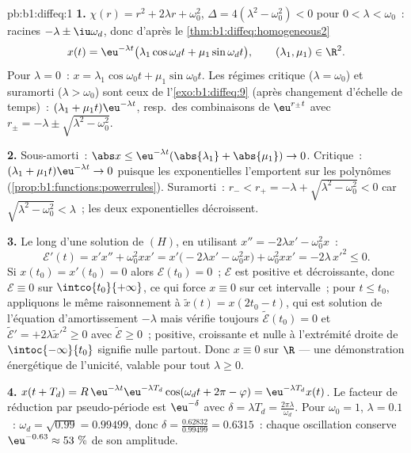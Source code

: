\begin{solution}{pb:b1:diffeq:1}
\textbf{1.} $\chi(r) = r^2 + 2\lambda r + \omega_0^2$, $\Delta =
4(\lambda^2 - \omega_0^2) < 0$ pour $0 < \lambda < \omega_0$~: racines
$-\lambda \pm \iu\omega_d$, donc d'après
le \cref{thm:b1:diffeq:homogeneous2}
\[
x(t) = \eu^{-\lambda t}\bigl(\lambda_1\cos\omega_d t +
\mu_1\sin\omega_d t\bigr), \qquad (\lambda_1, \mu_1) \in \R^2 .
\]
Pour $\lambda = 0$~: $x = \lambda_1\cos\omega_0 t +
\mu_1\sin\omega_0 t$. Les régimes critique ($\lambda = \omega_0$) et
suramorti ($\lambda > \omega_0$) sont ceux de
l'\cref{exo:b1:diffeq:9} (après changement d'échelle de temps)~:
$(\lambda_1 + \mu_1 t)\eu^{-\lambda t}$, resp.\ des combinaisons de
$\eu^{r_\pm t}$ avec $r_\pm = -\lambda \pm \sqrt{\lambda^2 -
\omega_0^2}$.

\textbf{2.} Sous-amorti~: $\abs x \leq \eu^{-\lambda
t}(\abs{\lambda_1} + \abs{\mu_1}) \to 0$. Critique~: $(\lambda_1 +
\mu_1 t)\eu^{-\lambda t} \to 0$ puisque les exponentielles l'emportent
sur les polynômes (\cref{prop:b1:functions:powerrules}). Suramorti~:
$r_- < r_+ = -\lambda + \sqrt{\lambda^2 - \omega_0^2} < 0$ car
$\sqrt{\lambda^2 - \omega_0^2} < \lambda$~; les deux exponentielles
décroissent.

\textbf{3.} Le long d'une solution de $(H)$, en utilisant $x'' =
-2\lambda x' - \omega_0^2 x$~:
\[
\mathcal E'(t) = x'x'' + \omega_0^2 x x'
= x'\bigl(-2\lambda x' - \omega_0^2 x\bigr) + \omega_0^2 xx'
= -2\lambda\,x'^2 \leq 0 .
\]
Si $x(t_0) = x'(t_0) = 0$ alors $\mathcal E(t_0) = 0$~; $\mathcal E$
est positive et décroissante, donc $\mathcal E \equiv 0$ sur
$\intco{t_0}{+\infty}$, ce qui force $x \equiv 0$ sur cet
intervalle~; pour $t \leq t_0$, appliquons le même raisonnement à
$\tilde x(t) = x(2t_0 - t)$, qui est solution de l'équation
d'amortissement $-\lambda$ mais vérifie toujours
$\tilde{\mathcal E}(t_0) = 0$ et $\tilde{\mathcal E}' =
+2\lambda\tilde x'^2 \geq 0$ avec $\tilde{\mathcal E} \geq 0$~;
positive, croissante et nulle à l'extrémité droite de
$\intoc{-\infty}{t_0}$ signifie nulle partout. Donc $x \equiv 0$ sur
$\R$ --- une démonstration énergétique de l'unicité, valable pour tout
$\lambda \geq 0$.

\textbf{4.} $x(t + T_d) = R\,\eu^{-\lambda t}\eu^{-\lambda
T_d}\cos(\omega_d t + 2\pi - \varphi) = \eu^{-\lambda T_d}x(t)$. Le
facteur de réduction par pseudo-période est $\eu^{-\delta}$ avec
$\delta = \lambda T_d = \frac{2\pi\lambda}{\omega_d}$. Pour
$\omega_0 = 1$, $\lambda = 0.1$~: $\omega_d = \sqrt{0.99} =
0.99499$, donc $\delta = \frac{0.62832}{0.99499} = 0.6315$~: chaque
oscillation conserve $\eu^{-0.63} \approx 53~\%$ de son amplitude.


\end{solution}
